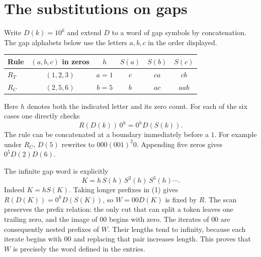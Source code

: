 \documentclass[10pt]{article}
\begin{document}
\section{The substitutions on gaps}
Write $D(k)=10^k$ and extend $D$ to a word of gap symbols by concatenation. The gap
alphabets below use the letters $a,b,c$ in the order displayed.
\begin{center}
\begin{tabular}{lccccc}
\toprule
Rule & $(a,b,c)$ in zeros & $h$ & $S(a)$ & $S(b)$ & $S(c)$\\
\midrule
$R_T$ & $(1,2,3)$ & $a=1$ & $c$ & $ca$ & $cb$\\
$R_C$ & $(2,5,6)$ & $b=5$ & $b$ & $ac$ & $aab$\\
\bottomrule
\end{tabular}
\end{center}
Here $h$ denotes both the indicated letter and its zero count. For each of the six cases
one directly checks
\[
                         R(D(k))\,0^h=0^h D(S(k)).
\tag{1}
\]
The rule can be concatenated at a boundary immediately before a $1$. For example under
$R_C$, $D(5)$ rewrites to $000(001)^2 0$. Appending five zeros gives $0^5D(2)D(6)$.

The infinite gap word is explicitly
\[
                         K=h\,S(h)\,S^2(h)\,S^3(h)\cdots .
\tag{2}
\]
Indeed $K=hS(K)$. Taking longer prefixes in (1) gives $R(D(K))=0^hD(S(K))$, so
$W=00D(K)$ is fixed by $R$. The scan preserves the prefix relation: the only cut that can
split a token leaves one trailing zero, and the image of $00$ begins with zero. The iterates
of $00$ are consequently nested prefixes of $W$. Their lengths tend to infinity, because
each iterate begins with $00$ and replacing that pair increases length. This proves that
$W$ is precisely the word defined in the entries.
\end{document}
